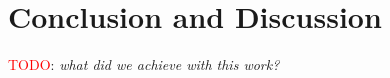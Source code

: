 \newpage
\section{Conclusion and Discussion} \label{sec:ConclusionAndDiscussion}
\textcolor{red}{TODO}: \textsl{what did we achieve with this work?}